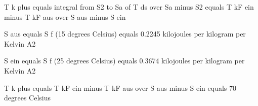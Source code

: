 T k plus equals integral from S2 to Sa of T ds over Sa minus S2 equals T kF ein minus T kF aus over S aus minus S ein

S aus equals S f (15 degrees Celsius) equals 0.2245 kilojoules per kilogram per Kelvin A2

S ein equals S f (25 degrees Celsius) equals 0.3674 kilojoules per kilogram per Kelvin A2

T k plus equals T kF ein minus T kF aus over S aus minus S ein equals 70 degrees Celsius